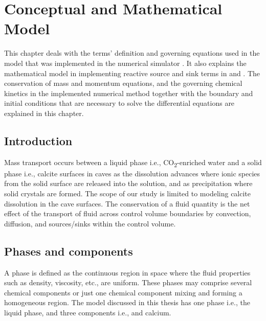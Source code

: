\chapter{Conceptual and Mathematical Model}\label{chapter:conceptualmodel}
\thispagestyle{empty}

This chapter deals with the terms' definition and governing equations used in the model that was 
implemented in the numerical simulator \DuMuX. It also explains the mathematical model 
in implementing reactive source and sink terms in \DuMuX and \MATLAB. The conservation of mass and momentum equations, 
and the governing chemical kinetics in the implemented numerical method together with the boundary 
and initial conditions that are necessary to solve the differential equations are explained in this chapter. 

\section{Introduction}
Mass transport occurs between a liquid phase i.e., CO\textsubscript{2}-enriched water and a solid phase 
i.e., calcite surfaces in caves as the dissolution advances where ionic species from the solid surface are 
released into the solution, and as precipitation where solid crystals are formed. The scope of our study 
is limited to modeling calcite dissolution in the cave surfaces. The conservation of a 
fluid quantity is the net effect of the transport of fluid across control volume boundaries by convection, 
diffusion, and sources/sinks within the control volume.
 
\section{Phases and components}
A phase is defined as the continuous region in space where the fluid properties such as density, viscosity, etc., are uniform. 
These phases may comprise several chemical components or just one chemical component mixing and forming a homogeneous region. 
The model discussed in this thesis has one phase i.e., the liquid phase, and three components i.e.,  and calcium.

